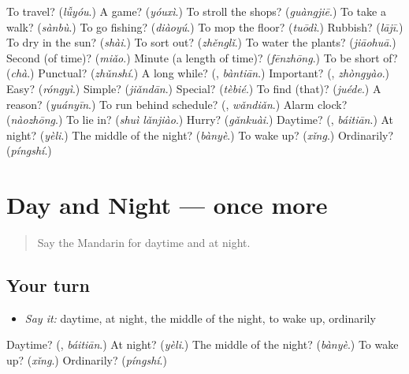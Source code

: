 \begin{tcolorbox}[breakable,colback=teal!4,colframe=teal!35!black,title={Before you move on}]
To travel? (\emph{lǚyóu}.) A game? (\emph{yóuxì}.) To stroll the shops? (\emph{guàngjiē}.) To take a walk? (\emph{sànbù}.) To go fishing? (\emph{diàoyú}.) To mop the floor? (\emph{tuōdì}.) Rubbish? (\emph{lājī}.) To dry in the sun? (\emph{shài}.) To sort out? (\emph{zhěnglǐ}.) To water the plants? (\emph{jiāohuā}.) Second (of time)? (\emph{miǎo}.) Minute (a length of time)? (\emph{fēnzhōng}.) To be short of? (\emph{chà}.) Punctual? (\emph{zhǔnshí}.) A long while? (\textbf{}, \emph{bàntiān}.) Important? (\textbf{}, \emph{zhòngyào}.) Easy? (\emph{róngyì}.) Simple? (\emph{jiǎndān}.) Special? (\emph{tèbié}.) To find (that)? (\emph{juéde}.) A reason? (\emph{yuányīn}.) To run behind schedule? (\textbf{}, \emph{wǎndiǎn}.) Alarm clock? (\emph{nàozhōng}.) To lie in? (\emph{shuì lǎnjiào}.) Hurry? (\emph{gǎnkuài}.) Daytime? (\textbf{}, \emph{báitiān}.) At night? (\emph{yèli}.) The middle of the night? (\emph{bànyè}.) To wake up? (\emph{xǐng}.) Ordinarily? (\emph{píngshí}.)
\end{tcolorbox}
\section[(dialogue)]{Day and Night — once more}

\label{lesson:ZH-R146-review-final-146}



\begin{quote}
Say the Mandarin for daytime and at night.
\end{quote}

\subsection*{Your turn}
\begin{itemize}
\raggedright
  \item \emph{Say it:} daytime, at night, the middle of the night, to wake up, ordinarily
\end{itemize}

\begin{tcolorbox}[breakable,colback=teal!4,colframe=teal!35!black,title={Before you move on}]
Daytime? (\textbf{}, \emph{báitiān}.) At night? (\emph{yèli}.) The middle of the night? (\emph{bànyè}.) To wake up? (\emph{xǐng}.) Ordinarily? (\emph{píngshí}.)
\end{tcolorbox}
